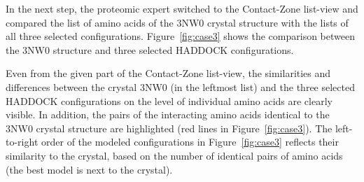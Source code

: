 \documentclass{bmcart}
\def\MatView {Matrix view\xspace}
\def\CoZoListView {Contact-Zone list-view\xspace}
\begin{document}

In the next step, the proteomic expert switched to the \CoZoListView and compared the list of amino acids of the 3NW0 crystal structure with the lists of all three selected configurations.
Figure~\ref{fig:case3} shows the comparison between the 3NW0 structure and three selected HADDOCK configurations.

Even from the given part of the \CoZoListView, the similarities and differences between the crystal 3NW0 (in the leftmost list) and the three selected HADDOCK configurations on the level of individual amino acids are clearly visible.
In addition, the pairs of the interacting amino acids identical to the 3NW0 crystal structure are highlighted (red lines in Figure~\ref{fig:case3}). 
The left-to-right order of the modeled configurations in Figure~\ref{fig:case3} reflects their similarity to the crystal, based on the number of identical pairs of amino acids (the best model is next to the crystal).


\end{document}

